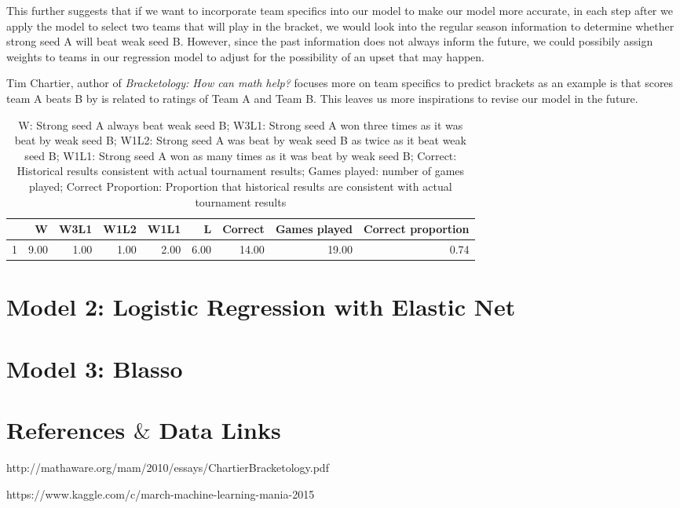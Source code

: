 \documentclass{article} %
\begin{document}
This further suggests that if we want to incorporate team specifics into our model to make our model more accurate, in each step after we apply the model to select two teams that will play in the bracket, we would look into the regular season information to determine whether strong seed A will beat weak seed B. However, since the past information does not always inform the future, we could possibily assign weights to teams in our regression model to adjust for the possibility of an upset that may happen. 

Tim Chartier, author of \textit{Bracketology: How can math help?} focuses more on team specifics to predict brackets as an example is that scores team A beats B by is related to ratings of Team A and Team B. This leaves us more inspirations to revise our model in the future. 

\begin{table}[ht]
\centering
\begin{tabular}{rrrrrrrrr}
  \hline
 & W & W3L1 & W1L2 & W1L1 & L & Correct & Games played & Correct proportion \\ 
  \hline
1 & 9.00 & 1.00 & 1.00 & 2.00 & 6.00 & 14.00 & 19.00 & 0.74 \\ 
   \hline
\end{tabular}

\caption{W: Strong seed A always beat weak seed B; W3L1: Strong seed A won three times as it was beat by weak seed B; W1L2: Strong seed A was beat by weak seed B as twice as it beat weak seed B; W1L1: Strong seed A won as many times as it was beat by weak seed B; Correct: Historical results consistent with actual tournament results; Games played: number of games played; Correct Proportion: Proportion that historical results are consistent with actual tournament results}
\end{table}









\section{Model 2: Logistic Regression with Elastic Net}
\section{Model 3: Blasso}








\section{References $\&$ Data Links}
http://mathaware.org/mam/2010/essays/ChartierBracketology.pdf

https://www.kaggle.com/c/march-machine-learning-mania-2015
\end{document}
